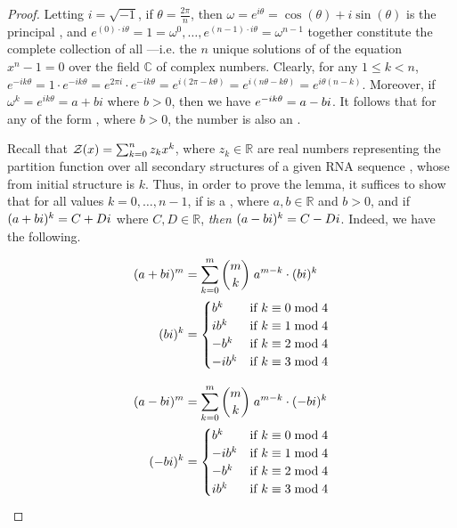 \documentclass[11pt, oneside]{Thesis} %
\begin{document}
\begin{proof}
Letting $i = \sqrt{-1}$, if
$\theta = \frac{2 \pi}{n}$, then
$\omega = e^{i \theta} = \cos(\theta) + i \sin(\theta)$
is the principal \nRoU, and
$e^{(0) \cdot i \theta} = 1 = \omega^{0}, \dots ,
e^{(n-1) \cdot i \theta} = \omega^{n-1}$ together
constitute the complete collection of all
\nRoUs---i.e. the $n$ unique solutions of
of the equation $x^n -1 = 0$ over the field $\mathbb{C}$ of complex numbers.
Clearly, for any $1 \leq k < n$,
$e^{-i k \theta} = 1 \cdot e^{-i k \theta} =
e^{2 \pi i} \cdot e^{-i k \theta} = e^{i(2 \pi - k \theta)} =
e^{i(n \theta - k \theta)} = e^{i \theta (n - k)}$.
Moreover, if $\omega^k = e^{i k \theta} = a + b i$ where
$b>0$, then we have $e^{-i k \theta} = a-bi$. It follows that for any
\nRoU of the form \aPbi, where $b>0$, the number \aMbi
is also an \nRoU.

Recall that ${\mathcal Z}_{}(x) = \sum_{k=0}^n z_k x^k$, where
$z_k \in \mathbb{R}$ are real numbers representing the partition function
 over
all secondary structures of a given RNA sequence \seqN,
whose \bpd from initial structure
\strSt is $k$. Thus, in order to prove the lemma, it suffices to show
that for all values $k=0,\dots,n-1$, if \aPbi is a
\nRoU, where $a,b \in \mathbb{R}$
and $b>0$, and if $(a+bi)^k = C+Di$ where $C,D \in \mathbb{R}$, {\em then}
$(a-bi)^k = C-Di$. Indeed, we have the following.

\begin{align}
\begin{split}
(a+bi)^m &= \sum_{k=0}^m \binom{m}{k}\; a^{m-k} \cdot (bi)^k \\
(bi)^k  &=
\begin{cases}
b^k    & \text{if $k \equiv 0 \bmod 4$} \\
i b^k  & \text{if $k \equiv 1 \bmod 4$} \\
-b^k   & \text{if $k \equiv 2 \bmod 4$} \\
-i b^k & \text{if $k \equiv 3 \bmod 4$} \\
\end{cases}
\end{split}
\end{align}

\begin{align}
\begin{split}
(a-bi)^m &= \sum_{k=0}^m \binom{m}{k}\; a^{m-k} \cdot (-bi)^k \\
(-bi)^k &=
\begin{cases}
b^k   & \text{if $k \equiv 0 \bmod 4$} \\
-ib^k & \text{if $k \equiv 1 \bmod 4$} \\
-b^k  & \text{if $k \equiv 2 \bmod 4$} \\
ib^k  & \text{if $k \equiv 3 \bmod 4$} \\
\end{cases}
\end{split}
\end{align}


\end{proof}
\end{document}
